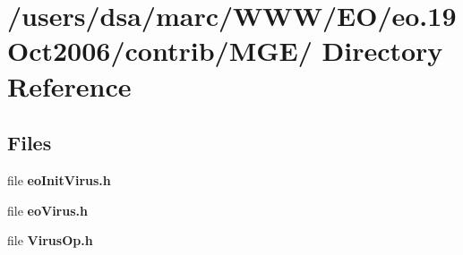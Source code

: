 \section{/users/dsa/marc/WWW/EO/eo.19Oct2006/contrib/MGE/ Directory Reference}
\label{dir_000015}
\subsection*{Files}
\begin{CompactItemize}
\item 
file {\bf eoInitVirus.h}
\item 
file {\bf eoVirus.h}
\item 
file {\bf VirusOp.h}
\end{CompactItemize}
